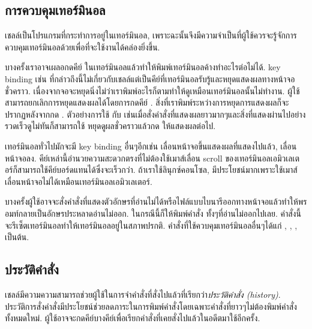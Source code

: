 \begin{thwbr}
\begin{figure}[!htb]
\end{figure}

\subsection{การควบคุมเทอร์มินอล}
เชลล์เป็นโปรแกรมที่กระทำการอยู่ในเทอร์มินอล, เพราะฉะนั้นจึงมีความจำเป็นที่ผู้ใช้ควรจะรู้จักการควบคุมเทอร์มินอลด้วยเพื่อที่จะใช้งานได้คล่องยิ่งขึ้น.

บางครั้งเราอาจเผลอกดคีย์  ในเทอร์มินอลแล้วทำให้พิมพ์เทอร์มินอลค้างทำอะไรต่อไม่ได้.  key binding เช่น  ที่กล่าวถึงนี้ไม่เกี่ยวกับเชลล์แต่เป็นคีย์ที่เทอร์มินอลรับรู้และหยุดแสดงผลทางหน้าจอชั่วคราว. เนื่องจากจอจะหยุดนิ่งไม่ว่าเราพิมพ์อะไรก็ตามทำให้ดูเหมือนเทอร์มินอลนั้นไม่ทำงาน. ผู้ใช้สามารถยกเลิกการหยุดแสดงผลได้โดยการกดคีย์ . สิ่งที่เราพิมพ์ระหว่างการหยุดการแสดงผลก็จะปรากฏหลังจากกด . ตัวอย่างการใช้  กับ  เช่นเมื่อสั่งคำสั่งที่แสดงผลยาวมากๆและสิ่งที่แสดงผ่านไปอย่างรวดเร็วดูไม่ทันก็สามารถใช้  หยุดดูผลชั่วคราวแล้วกด  ให้แสดงผลต่อไป.

เทอร์มินอลทั่วไปมักจะมี key binding อื่นๆอีกเช่น  เลื่อนหน้าจอขึ้นแสดงผลที่แสดงไปแล้ว,  เลื่อนหน้าจอลง. คีย์เหล่านี้อำนวยความสะดวกตรงที่ไม่ต้องใช้เมาส์เลื่อน scroll ของเทอร์มินอลเอมิวเลเตอร์ก็สามารถใช้คีย์บอร์ดแทนได้ซึ่งจะเร็วกว่า. ถ้าเราใช้ลินุกซ์คอนโซล,  มีประโยชน์มากเพราะใช้เมาส์เลื่อนหน้าจอไม่ได้เหมือนเทอร์มินอลเอมิวเลเตอร์.

บางครั้งผู้ใช้อาจจะสั่งคำสั่งที่แสดงตัวอักษรที่อ่านไม่ได้หรือไฟล์แบบไบนารีออกทางหน้าจอแล้วทำให้พรอมท์กลายเป็นอักษรประหลาดอ่านไม่ออก. ในกรณีนี้ก็ให้พิมพ์คำสั่ง  ทั้งๆที่อ่านไม่ออกไปเลย. คำสั่งนี้จะรีเซ็ตเทอร์มินอลทำให้เทอร์มินอลอยู่ในสภาพปรกติ. คำสั่งที่ใช้ควบคุมเทอร์มินอลอื่นๆได้แก่ , , ,  เป็นต้น. 


\subsection{ประวัติคำสั่ง}
เชลล์มีความความสามารถช่วยผู้ใช้ในการจำคำสั่งที่สั่งไปแล้วที่เรียกว่า\emph{ประวัติคำสั่ง (history)}. ประวัติการสั่งคำสั่งมีประโยชน์ช่วยลดภาระในการพิมพ์คำสั่งโดยเฉพาะคำสั่งที่ยาวๆไม่ต้องพิมพ์คำสั่งทั้งหมดใหม่. ผู้ใช้อาจจะกดคีย์บางคีย์เพื่อเรียกคำสั่งที่เคยสั่งไปแล้วในอดีตมาใช้อีกครั้ง. 


\end{thwbr}
